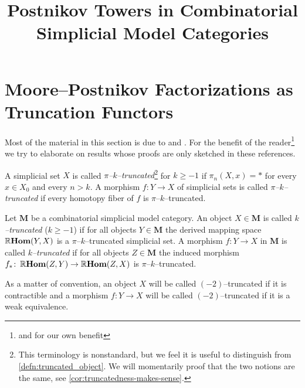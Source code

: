 




\title{Postnikov Towers in Combinatorial Simplicial Model Categories}
\date{}
\maketitle

{\footnotesize
\tableofcontents
}

\section{Moore--Postnikov Factorizations as Truncation Functors}
Most of the material in this section is due to \cite{mr2522659} and \cite{rezkhomotopytoposes}. For the benefit of the reader\footnote{and for our own benefit} we try to elaborate on results whose proofs are only sketched in these references.

\begin{definition}\label{defn:truncated_simp}
  A simplicial set \(X\) is called \emph{\(\pi\)--\(k\)--truncated}\footnote{This terminology is nonstandard, but we feel it is useful to distinguish from \autoref{defn:truncated_object}. We will momentarily proof that the two notions are the same, see \autoref{cor:truncatedness-makes-sense}.} for \(k\geq -1\) if \(\pi_{n}(X,x) = *\) for every \(x\in X_{0}\) and every \(n>k\). A morphism \(f\colon Y\to X\) of simplicial sets is called \emph{\(\pi\)--\(k\)--truncated} if every homotopy fiber of \(f\) is \(\pi\)--\(k\)--truncated.
\end{definition}

\begin{definition}\label{defn:truncated_object}
  Let \(\mathbf{M}\) be a combinatorial simplicial model category. An object \(X\in\mathbf{M}\) is called \emph{\(k\)--truncated} (\(k\geq -1\)) if for all objects \(Y\in\mathbf{M}\) the derived mapping space \(\operatorname{\mathbb{R}\textnormal{\bfseries Hom}}(Y,X)\) is a \(\pi\)--\(k\)--truncated simplicial set. A morphism \(f\colon Y\to X\) in \(\mathbf{M}\) is called \emph{\(k\)--truncated} if for all objects \(Z\in\mathbf{M}\) the induced morphism \(f_{*}\colon \operatorname{\mathbb{R}\textnormal{\bfseries Hom}}(Z,Y)\to\operatorname{\mathbb{R}\textnormal{\bfseries Hom}}(Z,X)\) is \(\pi\)--\(k\)--truncated.
\end{definition}

As a matter of convention, an object \(X\) will be called \((-2)\)--truncated if it is contractible and a morphism \(f\colon Y\to X\) will be called \((-2)\)--truncated if it is a weak equivalence.

